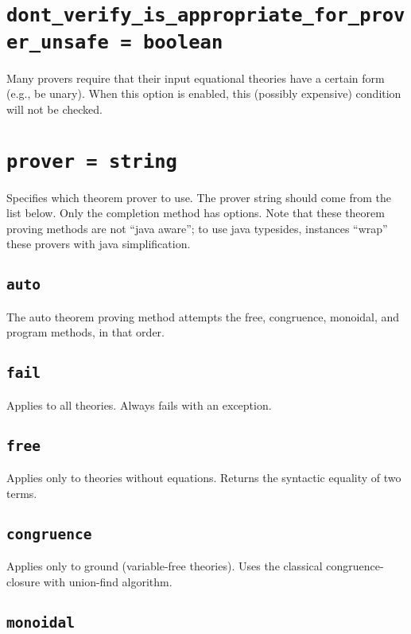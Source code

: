 \documentclass[10pt]{book}
\begin{document}
\section{{\tt dont\_verify\_is\_appropriate\_for\_prover\_unsafe = boolean}}
Many provers require that their input equational theories have a certain form (e.g., be unary).  When this option is enabled, this (possibly expensive) condition will not be checked.
				
\section{{\tt prover = string}}
Specifies which theorem prover to use.  The prover string should come from the list below.  Only the completion method has options.  Note that these theorem proving methods are not ``java aware''; to use java typesides, instances ``wrap'' these provers with java simplification.

\subsection{{\tt auto}}

The auto theorem proving method attempts the free, congruence, monoidal, and program methods, in that order.

 \subsection{{\tt fail}}
 
 Applies to all theories.  Always fails with an exception.
 
  \subsection{{\tt free}}
  
  Applies only to theories without equations.  Returns the syntactic equality of two terms.

\subsection{{\tt congruence}}

 Applies only to ground (variable-free theories).  Uses the classical congruence-closure with union-find algorithm.

\subsection{{\tt monoidal}}
\end{document}
